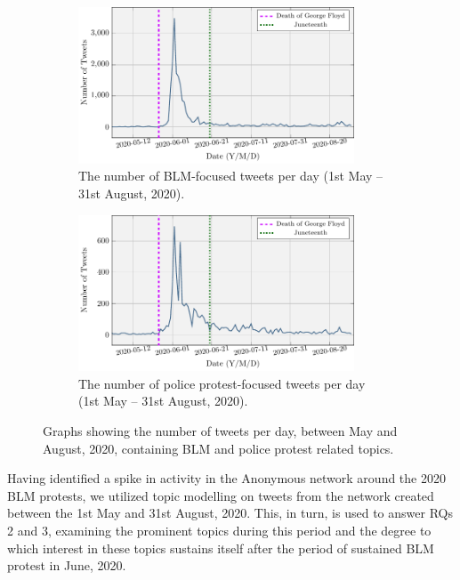 \documentclass[letterpaper]{article}
\begin{document}
\begin{figure}[!ht]
\centering
\begin{subfigure}[b]{0.4\textwidth}
\centering
\includegraphics[width=0.9\textwidth]{num_blm_tweets.pdf}
\caption{The number of BLM-focused tweets per day (1st May -- 31st August, 2020).}
\end{subfigure}
\quad
\begin{subfigure}[b]{0.4\textwidth}
\centering
\includegraphics[width=0.9\textwidth]{num_police_tweets.pdf}
\caption{The number of police protest-focused tweets per day (1st May -- 31st August, 2020).}
\end{subfigure}
\caption{Graphs showing the number of tweets per day, between May and August, 2020, containing BLM and police protest related topics.}
\label{fig:TweetsPerDay}
\end{figure}

Having identified a spike in activity in the Anonymous network around the 2020 BLM protests, we utilized topic modelling on tweets from the network created between the 1st May and 31st August, 2020. This, in turn, is used to answer RQs 2 and 3, examining the prominent topics during this period and the degree to which interest in these topics sustains itself after the period of sustained BLM protest in June, 2020.
\end{document}
